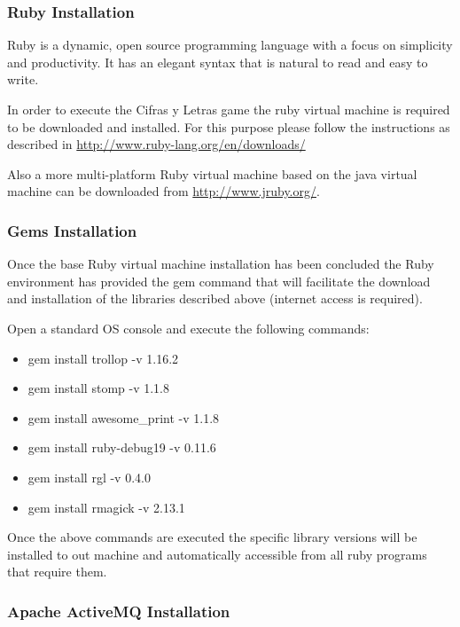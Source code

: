 \documentclass[a4paper,10pt,titlepage]{article}
\begin{document}
\subsubsection{Ruby Installation}

\par Ruby is a dynamic, open source programming language with a focus on simplicity and productivity. It has an elegant syntax that is natural to read and easy to write.

\par In order to execute the Cifras y Letras game the ruby virtual machine is required to be downloaded and installed. For this purpose please follow the instructions as described in \url{http://www.ruby-lang.org/en/downloads/}

\par Also a more multi-platform Ruby virtual machine based on the java virtual machine can be downloaded from \url{http://www.jruby.org/}.

\subsubsection{Gems Installation}

\par Once the base Ruby virtual machine installation has been concluded the Ruby environment has provided the gem command that will facilitate the download and installation of the libraries described above (internet access is required).

\par Open a standard OS console and execute the following commands:
\begin{itemize}
	\item gem install trollop -v 1.16.2
	\item gem install stomp -v 1.1.8
	\item gem install awesome\_print -v 1.1.8
	\item gem install ruby-debug19 -v 0.11.6
	\item gem install rgl -v 0.4.0
	\item gem install rmagick -v 2.13.1
\end{itemize}

\par Once the above commands are executed the specific library versions will be installed to out machine and automatically accessible from all ruby programs that require them.

\subsubsection{Apache ActiveMQ Installation}
\end{document}
